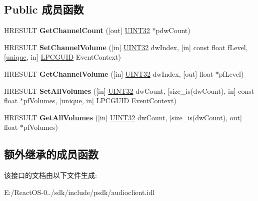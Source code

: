 \subsection*{Public 成员函数}
\begin{DoxyCompactItemize}
\item 
\mbox{\label{interface_i_channel_audio_volume_ab6600f40c4c42555489d328b38b62a4b}} 
H\+R\+E\+S\+U\+LT {\bfseries Get\+Channel\+Count} (\mbox{[}out\mbox{]} \hyperlink{_processor_bind_8h_ae1e6edbbc26d6fbc71a90190d0266018}{U\+I\+N\+T32} $\ast$pdw\+Count)
\item 
\mbox{\label{interface_i_channel_audio_volume_aa9289a2bc2eeb3d4b8fcf55df3c4a93d}} 
H\+R\+E\+S\+U\+LT {\bfseries Set\+Channel\+Volume} (\mbox{[}in\mbox{]} \hyperlink{_processor_bind_8h_ae1e6edbbc26d6fbc71a90190d0266018}{U\+I\+N\+T32} dw\+Index, \mbox{[}in\mbox{]} const float f\+Level, \mbox{[}\hyperlink{interfaceunique}{unique}, in\mbox{]} \hyperlink{interface_g_u_i_d}{L\+P\+C\+G\+U\+ID} Event\+Context)
\item 
\mbox{\label{interface_i_channel_audio_volume_ae4ca3c562142169112442d468646097a}} 
H\+R\+E\+S\+U\+LT {\bfseries Get\+Channel\+Volume} (\mbox{[}in\mbox{]} \hyperlink{_processor_bind_8h_ae1e6edbbc26d6fbc71a90190d0266018}{U\+I\+N\+T32} dw\+Index, \mbox{[}out\mbox{]} float $\ast$pf\+Level)
\item 
\mbox{\label{interface_i_channel_audio_volume_a657ea1c9e705e2d11ec65aff3853095a}} 
H\+R\+E\+S\+U\+LT {\bfseries Set\+All\+Volumes} (\mbox{[}in\mbox{]} \hyperlink{_processor_bind_8h_ae1e6edbbc26d6fbc71a90190d0266018}{U\+I\+N\+T32} dw\+Count, \mbox{[}size\+\_\+is(dw\+Count), in\mbox{]} const float $\ast$pf\+Volumes, \mbox{[}\hyperlink{interfaceunique}{unique}, in\mbox{]} \hyperlink{interface_g_u_i_d}{L\+P\+C\+G\+U\+ID} Event\+Context)
\item 
\mbox{\label{interface_i_channel_audio_volume_a3295507fd45e71705121912d32fc379c}} 
H\+R\+E\+S\+U\+LT {\bfseries Get\+All\+Volumes} (\mbox{[}in\mbox{]} \hyperlink{_processor_bind_8h_ae1e6edbbc26d6fbc71a90190d0266018}{U\+I\+N\+T32} dw\+Count, \mbox{[}size\+\_\+is(dw\+Count), out\mbox{]} float $\ast$pf\+Volumes)
\end{DoxyCompactItemize}
\subsection*{额外继承的成员函数}


该接口的文档由以下文件生成\+:\begin{DoxyCompactItemize}
\item 
E\+:/\+React\+O\+S-\/0../sdk/include/psdk/audioclient.\+idl\end{DoxyCompactItemize}
